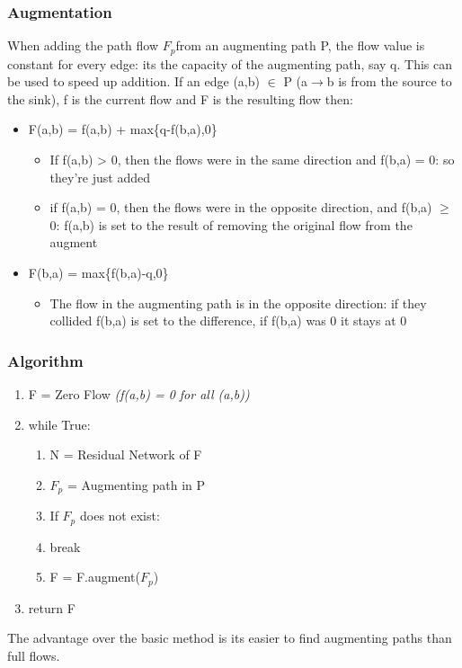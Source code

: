 \subsubsection{Augmentation}
When adding the path flow $F_p$from an augmenting path P, the flow value is constant for every edge: its the capacity of the augmenting path, say q. This can be used to speed up addition. If an edge (a,b) $\in$ P (a$\rightarrow$b is from the source to the sink), f is the current flow and F is the resulting flow then:
\begin{itemize}
    \item F(a,b) = f(a,b) + max\{q-f(b,a),0\}
        \begin{itemize}
            \item If f(a,b) > 0, then the flows were in the same direction and f(b,a) = 0: so they're just added
            \item if f(a,b) = 0, then the flows were in the opposite direction, and f(b,a) $\geq$ 0: f(a,b) is set to the result of removing the original flow from the augment 
        \end{itemize}
    \item F(b,a) = max\{f(b,a)-q,0\}
        \begin{itemize}
            \item The flow in the augmenting path is in the opposite direction: if they collided f(b,a) is set to the difference, if f(b,a) was 0 it stays at 0
        \end{itemize}    
\end{itemize}

\newpage
\subsubsection{Algorithm}
\begin{enumerate}[label=\Alph*]
    \item F = Zero Flow \emph{(f(a,b) = 0 for all (a,b))}
    \item while True: 
\begin{enumerate}[label=\arabic*]
    \item N = Residual Network of F
    \item $F_p$ = Augmenting path in P
    \item If $F_p$ does not exist:
    \item [] \quad break
    \item F = F.augment($F_p$)
\end{enumerate}  
\item return F
\end{enumerate}
The advantage over the basic method is its easier to find augmenting paths than full flows.

